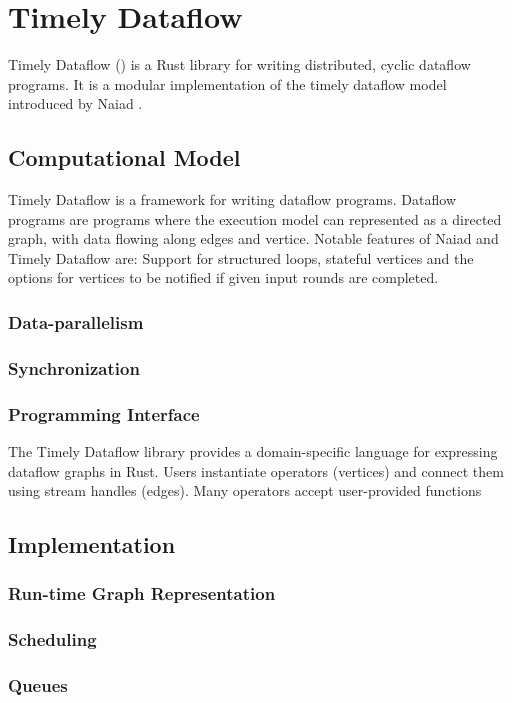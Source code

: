 \chapter{Timely Dataflow}\label{ch:background}

Timely Dataflow \cite{timely} () is a Rust library for writing distributed,
cyclic dataflow programs. It is a modular implementation of the timely dataflow
model introduced by Naiad \cite{naiad}. 

\section{Computational Model}

Timely Dataflow is a framework for writing dataflow programs. Dataflow programs
are programs where the execution model can represented as a directed graph, with data
flowing along edges and vertice. Notable features of Naiad and
Timely Dataflow are: Support for structured loops, stateful vertices and the
options for vertices to be notified if given input rounds are completed. \cite{naiad}

\subsection{Data-parallelism}

\subsection{Synchronization}



\subsection{Programming Interface}

The Timely Dataflow library provides a domain-specific language for expressing
dataflow graphs in Rust. Users instantiate operators (vertices) and connect
them using stream handles (edges). Many operators accept user-provided functions


\section{Implementation}



\subsection{Run-time Graph Representation}



\subsection{Scheduling}

\subsection{Queues}

